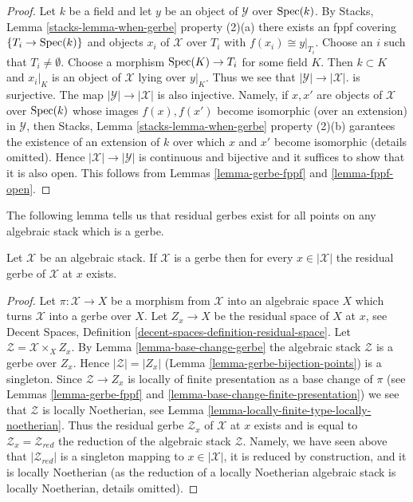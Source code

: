 \begin{proof}
Let $k$ be a field and let $y$ be an object
of $\mathcal{Y}$ over $\mathop{\rm Spec}(k)$. By
Stacks, Lemma \ref{stacks-lemma-when-gerbe} property (2)(a)
there exists an fppf covering $\{T_i \to \mathop{\rm Spec}(k)\}$
and objects $x_i$ of $\mathcal{X}$ over $T_i$ with $f(x_i) \cong y|_{T_i}$.
Choose an $i$ such that $T_i \not = \emptyset$. Choose a
morphism $\mathop{\rm Spec}(K) \to T_i$ for some field $K$.
Then $k \subset K$ and $x_i|_K$ is an object of $\mathcal{X}$ lying
over $y|_K$. Thus we see that
$|\mathcal{Y}| \to |\mathcal{X}|$. is surjective. The map
$|\mathcal{Y}| \to |\mathcal{X}|$ is also injective. Namely, if
$x, x'$ are objects of $\mathcal{X}$ over $\mathop{\rm Spec}(k)$ whose images
$f(x), f(x')$ become isomorphic (over an extension) in $\mathcal{Y}$, then
Stacks, Lemma \ref{stacks-lemma-when-gerbe} property (2)(b)
garantees the existence of an extension of $k$ over which $x$ and $x'$
become isomorphic (details omitted).
Hence $|\mathcal{X}| \to |\mathcal{Y}|$ is continuous and bijective
and it suffices to show that it is also open.
This follows from
Lemmas \ref{lemma-gerbe-fppf} and \ref{lemma-fppf-open}.
\end{proof}

\noindent
The following lemma tells us that residual gerbes exist for all points
on any algebraic stack which is a gerbe.

\begin{lemma}
\label{lemma-gerbe-residual-gerbe-exists}
Let $\mathcal{X}$ be an algebraic stack. If $\mathcal{X}$ is a gerbe
then for every $x \in |\mathcal{X}|$ the residual gerbe of $\mathcal{X}$
at $x$ exists.
\end{lemma}

\begin{proof}
Let $\pi : \mathcal{X} \to X$ be a morphism from $\mathcal{X}$ into
an algebraic space $X$ which turns $\mathcal{X}$ into a gerbe over $X$.
Let $Z_x \to X$ be the residual space of $X$ at $x$, see
Decent Spaces, Definition \ref{decent-spaces-definition-residual-space}.
Let $\mathcal{Z} = \mathcal{X} \times_X Z_x$. By
Lemma \ref{lemma-base-change-gerbe}
the algebraic stack $\mathcal{Z}$ is a gerbe over $Z_x$.
Hence $|\mathcal{Z}| = |Z_x|$
(Lemma \ref{lemma-gerbe-bijection-points})
is a singleton. Since $\mathcal{Z} \to Z_x$ is locally of finite presentation
as a base change of $\pi$ (see
Lemmas \ref{lemma-gerbe-fppf} and \ref{lemma-base-change-finite-presentation})
we see that $\mathcal{Z}$ is locally Noetherian, see
Lemma \ref{lemma-locally-finite-type-locally-noetherian}.
Thus the residual gerbe $\mathcal{Z}_x$ of $\mathcal{X}$ at $x$
exists and is equal to $\mathcal{Z}_x = \mathcal{Z}_{red}$ the reduction
of the algebraic stack $\mathcal{Z}$. Namely, we have seen above
that $|\mathcal{Z}_{red}|$ is a singleton mapping to $x \in |\mathcal{X}|$,
it is reduced by construction, and it is locally Noetherian (as the
reduction of a locally Noetherian algebraic stack is locally Noetherian,
details omitted).
\end{proof}









